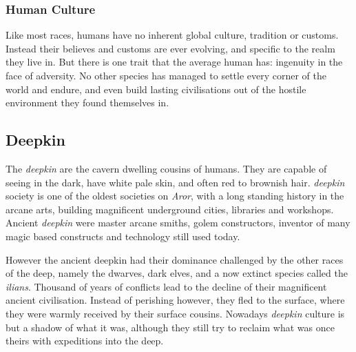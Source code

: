 \subsubsection*{Human Culture}

Like most races, humans have no inherent global culture, tradition or customs.
Instead their believes and customs are ever evolving, and specific to the
realm they live in. But there is one trait that the average human has: ingenuity
in the face of adversity. No other species has managed to settle every corner
of the world and endure, and even build lasting civilisations out of the
hostile environment they found themselves in.

\subsection*{Deepkin}



The \emph{deepkin} are the cavern dwelling cousins of humans. They are capable
of seeing in the dark, have white pale skin, and often red to brownish hair.
\emph{deepkin} society is one of the oldest societies on \emph{Aror}, with a
long standing history in the arcane arts, building magnificent underground
cities, libraries and workshops. Ancient \emph{deepkin} were master arcane
smiths, golem constructors, inventor of many magic based constructs and
technology still used today.

However the ancient deepkin had their dominance challenged by the other races
of the deep, namely the dwarves, dark elves, and a now extinct species called
the \emph{ilians}. Thousand of years of conflicts lead to the decline of their
magnificent ancient civilisation. Instead of perishing however, they fled to
the surface, where they were warmly received by their surface cousins. Nowadays
\emph{deepkin} culture is but a shadow of what it was, although they still try
to reclaim what was once theirs with expeditions into the deep.

